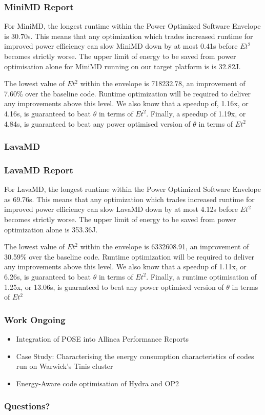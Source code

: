 \documentclass{beamer}
\begin{document}
  \begin{frame}
    \frametitle{MiniMD Report}
    For MiniMD, the longest runtime within the Power Optimized Software Envelope is 30.70s.
    This means that any optimization which trades increased runtime for improved power efficiency can slow MiniMD down by at most 0.41s before $Et^2$ becomes strictly worse.
    The upper limit of energy to be saved from power optimisation alone for MiniMD running on our target platform is is 32.82J.

    The lowest value of $Et^2$ within the envelope is 718232.78, an improvement of 7.60\% over the baseline code. 
    Runtime optimization will be required to deliver any improvements above this level.
    We also know that a speedup of, 1.16x, or 4.16s, is guaranteed to beat $\theta$ in terms of $Et^2$.
    Finally, a speedup of 1.19x, or 4.84s, is guaranteed to beat any power optimised version of $\theta$ in terms of $Et^2$
  \end{frame}

  \begin{frame}
    \frametitle{LavaMD}
    \begin{figure}
    \providecommand{\plotwidth}{.8\linewidth}
    
    \end{figure}
  \end{frame}
  \begin{frame}
    \frametitle{LavaMD Report}
For LavaMD, the longest runtime within the Power Optimized Software Envelope as 69.76s.
This means that any optimization which trades increased runtime for improved power efficiency can slow LavaMD down by at most 4.12s before $Et^2$ becomes strictly worse.
The upper limit of energy to be saved from power optimization alone is 353.36J.

The lowest value of $Et^2$ within the envelope is 6332608.91, an improvement of 30.59\% over the baseline code.
Runtime optimization will be required to deliver any improvements above this level.
We also know that a speedup of 1.11x, or 6.26s, is guaranteed to beat $\theta$ in terms of $Et^2$.
Finally, a runtime optimisation of 1.25x, or 13.06s, is guaranteed to beat any power optimised version of $\theta$ in terms of $Et^2$ 
  \end{frame}
  \begin{frame}
    \frametitle{Work Ongoing}
    \begin{itemize}
      \item{Integration of POSE into Allinea Performance Reports}
      \item{Case Study: Characterising the energy consumption characteristics of codes run on Warwick's Tinis cluster} 
      \item{Energy-Aware code optimisation of Hydra and OP2}
    \end{itemize}
  \end{frame}

  \begin{frame}
    \frametitle{Questions?}
  \end{frame}
\end{document}
